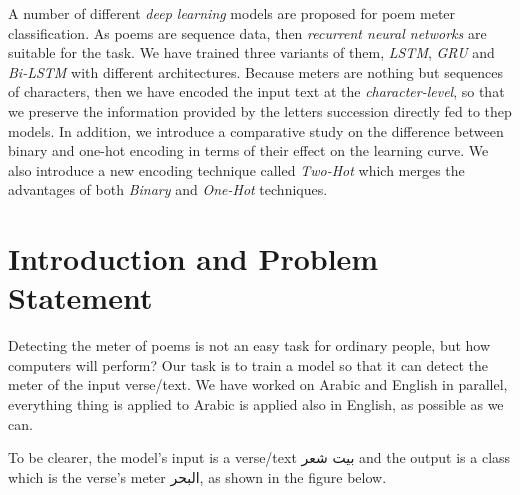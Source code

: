 \documentclass[12pt]{report}
\begin{document}
A number of different \textit{deep learning} models are proposed for poem meter
classification. As poems are sequence data, then \textit{recurrent neural
networks} are suitable for the task.  We have trained three variants of them,
\textit{LSTM}, \textit{GRU} and \textit{Bi-LSTM} with different architectures.
Because meters are nothing but sequences of characters,
then we have encoded the input text at the \textit{character-level},
so that we preserve the information provided by the letters succession directly fed to thep models. In addition,
we introduce a comparative study on the difference between binary and one-hot encoding
in terms of their effect on the learning curve. 
We also introduce a new encoding technique called \textit{Two-Hot} which 
merges the advantages of both \textit{Binary} and \textit{One-Hot} techniques.








\section*{Introduction and Problem Statement}
Detecting the meter of poems is not an easy task for ordinary people, but how
computers will perform? Our task is to train a model so that it can detect the
meter of the input verse/text.
We have worked on Arabic and English in parallel, everything thing is applied to
Arabic is applied also in English, as possible as we can.

To be clearer, the model's input is a verse/text \textarabic{بيت شعر} and the
output is a class which is the verse's meter \textarabic{البحر}, as shown in the
figure below.


\begin{center}
\end{center}
\end{document}
